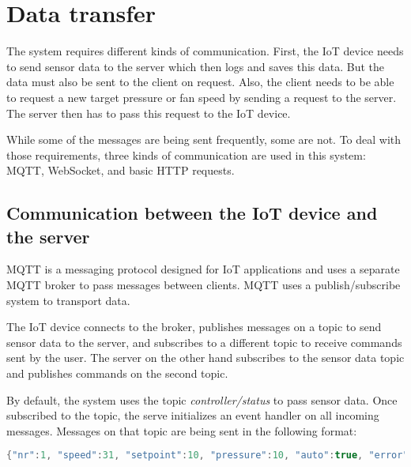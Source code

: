 
\section{Data transfer}
\label{sec:data_transfer}

The system requires different kinds of communication. First, the IoT device needs to send sensor data to the server which then logs and saves this data. But the data must also be sent to the client on request. Also, the client needs to be able to request a new target pressure or fan speed by sending a request to the server. The server then has to pass this request to the IoT device.

While some of the messages are being sent frequently, some are not. To deal with those requirements, three kinds of communication are used in this system: MQTT, WebSocket, and basic HTTP requests.



\subsection{Communication between the IoT device and the server}
\label{subsec:communication_between_the_iot_device_and_the_server}

MQTT is a messaging protocol designed for IoT applications and uses a separate MQTT broker to pass messages between clients. MQTT uses a publish/subscribe system to transport data.

The IoT device connects to the broker, publishes messages on a topic to send sensor data to the server, and subscribes to a different topic to receive commands sent by the user. The server on the other hand subscribes to the sensor data topic and publishes commands on the second topic.

By default, the system uses the topic \textit{controller/status} to pass sensor data. Once subscribed to the topic, the serve initializes an event handler on all incoming messages. Messages on that topic are being sent in the following format:

\begin{lstlisting}[language = Java, numbers = none]
 {"nr":1, "speed":31, "setpoint":10, "pressure":10, "auto":true, "error":false}
\end{lstlisting}

